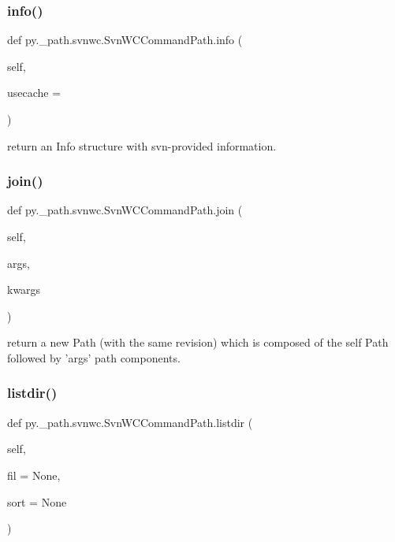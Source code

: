 \subsubsection{\texorpdfstring{info()}{info()}}
{\footnotesize\ttfamily def py.\+\_\+path.\+svnwc.\+Svn\+W\+C\+Command\+Path.\+info (\begin{DoxyParamCaption}\item[{}]{self,  }\item[{}]{usecache = {} }\end{DoxyParamCaption})}

\begin{DoxyVerb}return an Info structure with svn-provided information. \end{DoxyVerb}
 \mbox{\label{classpy_1_1__path_1_1svnwc_1_1_svn_w_c_command_path_a3028b477c4a26fc0c9142ce71ac624bf}} 
\subsubsection{\texorpdfstring{join()}{join()}}
{\footnotesize\ttfamily def py.\+\_\+path.\+svnwc.\+Svn\+W\+C\+Command\+Path.\+join (\begin{DoxyParamCaption}\item[{}]{self,  }\item[{}]{args,  }\item[{}]{kwargs }\end{DoxyParamCaption})}

\begin{DoxyVerb}return a new Path (with the same revision) which is composed
    of the self Path followed by 'args' path components.
\end{DoxyVerb}
 \mbox{\label{classpy_1_1__path_1_1svnwc_1_1_svn_w_c_command_path_aa00e57cdc51f59781a80a44afb1f843d}} 
\subsubsection{\texorpdfstring{listdir()}{listdir()}}
{\footnotesize\ttfamily def py.\+\_\+path.\+svnwc.\+Svn\+W\+C\+Command\+Path.\+listdir (\begin{DoxyParamCaption}\item[{}]{self,  }\item[{}]{fil = {\ttfamily None},  }\item[{}]{sort = {\ttfamily None} }\end{DoxyParamCaption})}

